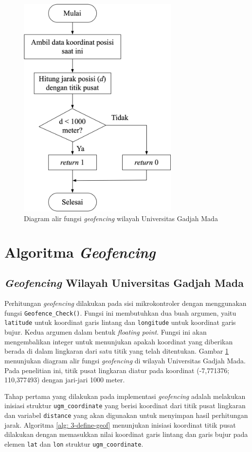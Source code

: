 \begin{figure}[H]
	\centering
	\includegraphics[width=8cm]{contents/chapter-3/flowchart-geofencing-ugm.png}
	\caption{Diagram alir fungsi \textit{geofencing} wilayah Universitas Gadjah Mada}
	\label{Fig: flowchart-geofencing-ugm}
\end{figure}

\section{Algoritma \textit{Geofencing}}
\subsection{\textit{Geofencing} Wilayah Universitas Gadjah Mada}
Perhitungan \textit{geofencing} dilakukan pada sisi mikrokontroler dengan menggunakan fungsi \texttt{Geofence\_Check()}. Fungsi ini membutuhkan dua buah argumen, yaitu \texttt{latitude} untuk koordinat garis lintang dan \texttt{longitude} untuk koordinat garis bujur. Kedua argumen dalam bentuk \textit{floating point}. Fungsi ini akan mengembalikan integer untuk menunjukan apakah koordinat yang diberikan berada di dalam lingkaran dari satu titik yang telah ditentukan. Gambar \ref{Fig: flowchart-geofencing-ugm} menunjukan diagram alir fungsi \textit{geofencing} di  wilayah Universitas Gadjah Mada. Pada penelitian ini, titik pusat lingkaran diatur pada koordinat (-7,771376; 110,377493) dengan jari-jari 1000 meter.

Tahap pertama yang dilakukan pada implementasi \textit{geofencing} adalah melakukan inisiasi struktur \texttt{ugm\_coordinate} yang berisi koordinat dari titik pusat lingkaran dan variabel \texttt{distance} yang akan digunakan untuk menyimpan hasil perhitungan jarak. Algoritma \ref{alg: 3-define-geof} menunjukan inisiasi koordinat titik pusat dilakukan dengan memasukkan nilai koordinat garis lintang dan garis bujur pada elemen \texttt{lat} dan \texttt{lon} struktur \texttt{ugm\_coordinate}.

